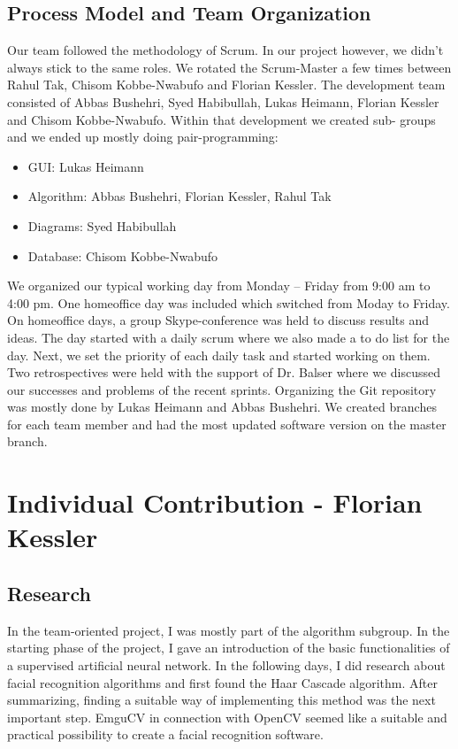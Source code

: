 \documentclass[12pt, a4paper]{article}
\begin{document}
\subsection{Process Model and Team Organization}
Our team followed the methodology of Scrum. In our project however, we didn't always stick to the same roles. We rotated the Scrum-Master a few times between Rahul Tak, Chisom Kobbe-Nwabufo and Florian Kessler. The development team consisted of Abbas Bushehri, Syed Habibullah, Lukas Heimann, Florian Kessler and Chisom Kobbe-Nwabufo. Within that development we created sub- groups and we ended up mostly doing pair-programming:
\begin{itemize}
\item GUI: Lukas Heimann
\item Algorithm: Abbas Bushehri, Florian Kessler, Rahul Tak
\item Diagrams: Syed Habibullah
\item Database: Chisom Kobbe-Nwabufo
\end{itemize}
We organized our typical working day from Monday – Friday from 9:00 am to 4:00 pm. One homeoffice day was included which switched from Moday to Friday. On homeoffice days, a group Skype-conference was held to discuss results and ideas. The day started with a daily scrum where we also made a to do list for the day. Next, we set the priority of each daily task and started working on them. Two retrospectives were held with the support of Dr. Balser where we discussed our successes and problems of the recent sprints. Organizing the Git repository was mostly done by Lukas Heimann and Abbas Bushehri. We created branches for each team member and had the most updated software version on the master branch.



\newpage




\section{Individual Contribution -  Florian Kessler}
\subsection{Research}
In the team-oriented project, I was mostly part of the algorithm subgroup. In the starting phase of the project, I gave an introduction of the basic functionalities of a supervised artificial neural network. In the following days, I did research about facial recognition algorithms and first found the Haar Cascade algorithm. After summarizing, finding a suitable way of implementing this method was the next important step. EmguCV in connection with OpenCV seemed like a suitable and practical possibility to create a facial recognition software.
\end{document}
